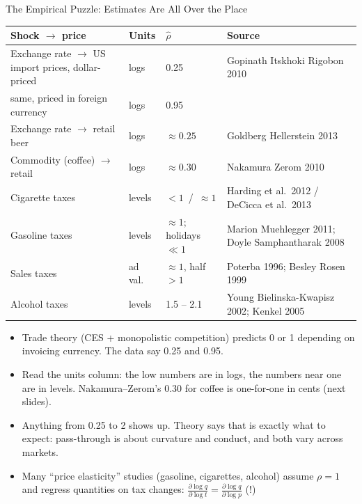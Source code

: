 \documentclass[aspectratio=169,10pt]{beamer}
\begin{document}
\begin{frame}{The Empirical Puzzle: Estimates Are All Over the Place}
\footnotesize
\begin{center}
\renewcommand{\arraystretch}{1.05}
\scriptsize
\begin{tabular}{llll}
\toprule
Shock $\rightarrow$ price & Units & $\widehat{\rho}$ & Source \\
\midrule
Exchange rate $\rightarrow$ US import prices, dollar-priced & logs & 0.25 & Gopinath Itskhoki Rigobon 2010 \\
\quad same, priced in foreign currency & logs & 0.95 & \\
Exchange rate $\rightarrow$ retail beer & logs & $\approx 0.25$ & Goldberg Hellerstein 2013 \\
Commodity (coffee) $\rightarrow$ retail & logs & $\approx 0.30$ & Nakamura Zerom 2010 \\
Cigarette taxes & levels & $<1$ \,/\, $\approx 1$ & Harding et al.\ 2012 / DeCicca et al.\ 2013 \\
Gasoline taxes & levels & $\approx 1$; holidays $\ll 1$ & Marion Muehlegger 2011; Doyle Samphantharak 2008 \\
Sales taxes & ad val. & $\approx 1$, half $>1$ & Poterba 1996; Besley Rosen 1999 \\
Alcohol taxes & levels & 1.5 -- 2.1 & Young Bielinska-Kwapisz 2002; Kenkel 2005 \\
\bottomrule
\end{tabular}
\end{center}
\footnotesize
\begin{itemize}
\item Trade theory (CES + monopolistic competition) predicts 0 or 1 depending on invoicing currency. The data say 0.25 and 0.95.
\item Read the \alert{units} column: the low numbers are in logs, the numbers near one are in levels. Nakamura--Zerom's 0.30 for coffee is one-for-one in cents (next slides).
\item Anything from 0.25 to 2 shows up. Theory says that is \alert{exactly what to expect}: pass-through is about curvature and conduct, and both vary across markets.
\item Many ``price elasticity'' studies (gasoline, cigarettes, alcohol) assume $\rho = 1$ and regress quantities on tax changes: $\frac{\partial \log q}{\partial \log t} = \frac{\partial \log q}{\partial \log p}$ (!)
\end{itemize}
\end{frame}
\end{document}
